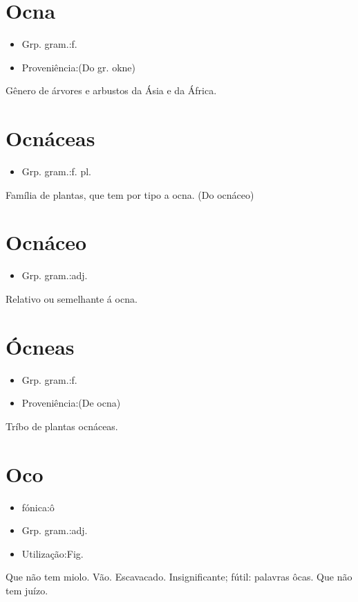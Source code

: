 \section{Ocna}
\begin{itemize}
\item {Grp. gram.:f.}
\end{itemize}
\begin{itemize}
\item {Proveniência:(Do gr. \textunderscore okne\textunderscore )}
\end{itemize}
Gênero de árvores e arbustos da Ásia e da África.
\section{Ocnáceas}
\begin{itemize}
\item {Grp. gram.:f. pl.}
\end{itemize}
Família de plantas, que tem por tipo a ocna.
(Do \textunderscore ocnáceo\textunderscore )
\section{Ocnáceo}
\begin{itemize}
\item {Grp. gram.:adj.}
\end{itemize}
Relativo ou semelhante á ocna.
\section{Ócneas}
\begin{itemize}
\item {Grp. gram.:f.}
\end{itemize}
\begin{itemize}
\item {Proveniência:(De \textunderscore ocna\textunderscore )}
\end{itemize}
Tríbo de plantas ocnáceas.
\section{Oco}
\begin{itemize}
\item {fónica:ô}
\end{itemize}
\begin{itemize}
\item {Grp. gram.:adj.}
\end{itemize}
\begin{itemize}
\item {Utilização:Fig.}
\end{itemize}
Que não tem miolo.
Vão.
Escavacado.
Insignificante; fútil: \textunderscore palavras ôcas\textunderscore .
Que não tem juízo.
